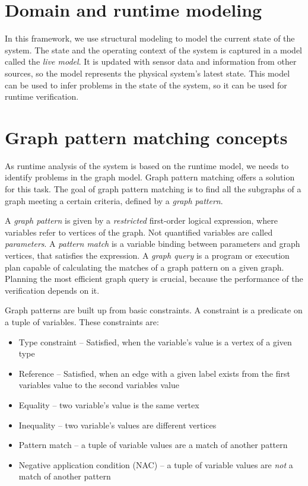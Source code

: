 \section{Domain and runtime modeling}

In this framework, we use structural modeling to model the current state of the system. 
The state and the operating context of the system is captured in a model called the \emph{live model}.
It is updated with sensor data and information from other sources, so the model represents the physical system's latest state. 
This model can be used to infer problems in the state of the system, so it can be used for runtime verification.

\section{Graph pattern matching concepts}

As runtime analysis of the system is based on the runtime model, we needs to identify problems in the graph model. 
Graph pattern matching offers a solution for this task. 
The goal of graph pattern matching is to find all the subgraphs of a graph meeting a certain criteria, defined by a \emph{graph pattern}.

A \emph{graph pattern} is given by a \emph{restricted} first-order logical expression, where variables refer to vertices of the graph.
Not quantified variables are called \emph{parameters}.  
A \emph{pattern match} is a variable binding between parameters and graph vertices, that satisfies the expression.
A \emph{graph query} is a program or execution plan capable of calculating the matches of a graph pattern on a given graph. 
Planning the most efficient graph query is crucial, because the performance of the verification depends on it.

Graph patterns are built up from basic constraints. 
A constraint is a predicate on a tuple of variables. 
These constraints are: 

\begin{itemize}
	\item Type constraint -- Satisfied, when the variable's value is a vertex of a given type
	\item Reference -- Satisfied, when an edge with a given label exists from the first variables value to the second variables value
	\item Equality -- two variable's value is the same vertex
	\item Inequality -- two variable's values are different vertices
	\item Pattern match -- a tuple of variable values are a match of another pattern
	\item Negative application condition (NAC) -- a tuple of variable values are \emph{not} a match of another pattern
\end{itemize}


